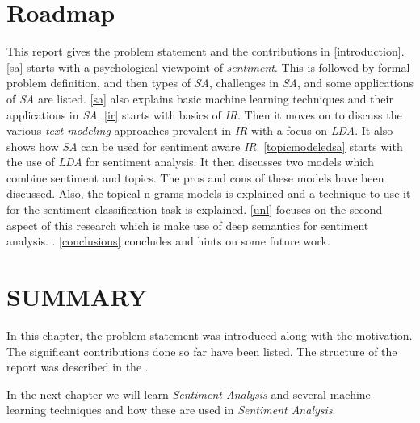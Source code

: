 
\section{Roadmap}\label{sec:roadmap}
\par
This report gives the problem statement and the contributions in \cref{introduction}. \cref{sa} starts with a psychological viewpoint of \textit{sentiment}. This is followed
by formal problem definition, and then types of \textit{SA}, challenges in \textit{SA}, and some applications of \textit{SA} are listed. \cref{sa} also explains basic 
machine learning techniques and their applications in \textit{SA}. \cref{ir} starts with basics of \textit{IR}. Then it moves on to discuss the various \textit{text modeling}
approaches prevalent in \textit{IR} with a focus on \textit{LDA}. It also shows how \textit{SA} can be used for sentiment aware \textit{IR}. \cref{topicmodeledsa} starts
with the use of \textit{LDA} for sentiment analysis. It then discusses two models which combine sentiment and topics. The pros and cons of these models have been discussed. 
Also, the topical n-grams models is explained and a technique to use it for the sentiment classification task is explained. \cref{unl} focuses on the second aspect of this 
research which is make use of deep semantics for sentiment analysis. . \cref{conclusions} concludes and hints on some future work.

\section*{SUMMARY}

In this chapter, the problem statement was introduced along with the motivation. The significant contributions done so far have been listed.
The structure of the report was described in the .

In the next chapter we will learn \textit{Sentiment Analysis} and several machine learning techniques and how these are used in \textit{Sentiment Analysis}.

\clearpage

